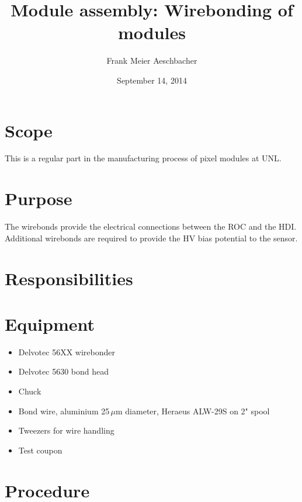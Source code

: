 \documentclass[12pt]{unlsilabsop}
\title{Module assembly: Wirebonding of modules}
\date{September 14, 2014}
\author{Frank Meier Aeschbacher}
\begin{document}
\maketitle

\section{Scope}
This is a regular part in the manufacturing process of pixel modules at UNL.

\section{Purpose}
The wirebonds provide the electrical connections between the ROC and the HDI. Additional wirebonds are required to provide the HV bias potential to the sensor.


\section{Responsibilities}

\section{Equipment}

\begin{itemize}
    \item Delvotec 56XX wirebonder
    \item Delvotec 5630 bond head
    \item Chuck
    \item Bond wire, aluminium 25\,$\mu$m diameter, Heraeus ALW-29S on 2" spool
    \item Tweezers for wire handling
    \item Test coupon
\end{itemize}

\section{Procedure}
\end{document}
